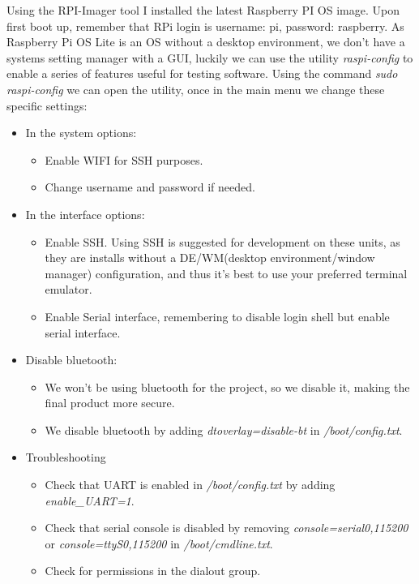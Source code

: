 \documentclass[a4paper,11pt]{scrartcl}
\begin{document}
Using the RPI-Imager tool I installed the latest Raspberry PI OS image. Upon first boot up, remember that RPi login is username: pi, password: raspberry. 
As Raspberry Pi OS Lite is an OS without a desktop environment, we don't have a systems setting manager with a GUI, luckily we can use the utility \textit{raspi-config} to enable a series of features useful for testing software. 
Using the command \textit{sudo raspi-config} we can open the utility, once in the main menu we change these specific settings:
\begin{itemize}    
    \item In the system options:
    \begin{itemize}
        \item Enable WIFI for SSH purposes.
        \item Change username and password if needed.
    \end{itemize}
    \item In the interface options:
    \begin{itemize}
        \item Enable SSH. Using SSH is suggested for development on these units, as they are installs without a DE/WM(desktop environment/window manager) configuration, and thus it's best to use your preferred terminal emulator.
        \item Enable Serial interface, remembering to disable login shell but enable serial interface.
    \end{itemize}
    \item Disable bluetooth:
    \begin{itemize}
        \item We won't be using bluetooth for the project, so we disable it, making the final product more secure.
        \item We disable bluetooth by adding \textit{dtoverlay=disable-bt} in \textit{/boot/config.txt}.
    \end{itemize}
    \item Troubleshooting
    \begin{itemize}
        \item Check that UART is enabled in \textit{/boot/config.txt} by adding \textit{enable\_UART=1}.
        \item Check that serial console is disabled by removing \textit{console=serial0,115200} or \textit{console=ttyS0,115200} in \textit{/boot/cmdline.txt}.
        \item Check for permissions in the dialout group.

\end{itemize}
\end{itemize}
\end{document}
